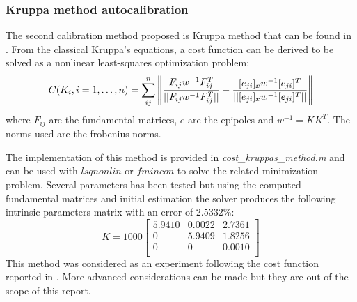 \documentclass[11pt]{article}
\begin{document}
\subsubsection{Kruppa method autocalibration}
The second calibration method proposed is Kruppa method that can be found in \cite{Prapitasari14} \cite{Pollefeys}. From the classical Kruppa's equations, a cost function can be derived to be solved as a nonlinear least-squares optimization problem:
\begin{equation}
    C(K_i, i = 1,\dots, n) = \sum_{ij}^{n} \norm{\frac{F_{ij}w^{-1}F_{ij}^T}{||F_{ij}w^{-1}F_{ij}^T||} - \frac{[e_{ji}]_xw^{-1}[e_{ji}]^T}{||[e_{ji}]_xw^{-1}[e_{ji}]^T||}}
\end{equation}
where $F_{ij}$ are the fundamental matrices, $e$ are the epipoles and $w^{-1} = KK^T$. The norms used are the frobenius norms.

\bigskip
The implementation of this method is provided in \textit{cost\_kruppas\_method.m} and can be used with $lsqnonlin$ or $fmincon$ to solve the related minimization problem. Several parameters has been tested but using the computed fundamental matrices and initial estimation the solver produces the following intrinsic parameters matrix with an error of $2.5332\%$:
    \begin{equation}
        K = 1000 \begin{bmatrix}
     
     5.9410  &  0.0022   & 2.7361\\
          0  &  5.9409   & 1.8256\\
          0  &       0   & 0.0010\\
\end{bmatrix}
\end{equation}
This method was considered as an experiment following the cost function reported in \cite{Pollefeys}. More advanced considerations can be made but they are out of the scope of this report. 
\newpage
\end{document}
